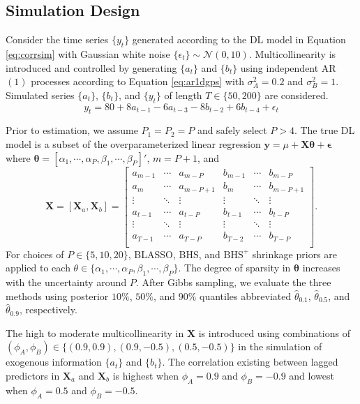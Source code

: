 \subsection{Simulation Design}
Consider the time series $\{y_t\}$ generated according to the DL model in Equation \ref{eq:corrsim} with Gaussian white noise $\{\epsilon_t\}\sim\mathcal{N}(0,10)$. Multicollinearity is introduced and controlled by generating $\{a_t\}$ and $\{b_t\}$ using independent AR$(1)$ processes according to Equation \ref{eq:ar1dgps} with $\sigma^2_A=0.2$ and $\sigma^2_B=1$. Simulated series $\{a_t\}$, $\{b_t\}$, and $\{y_t\}$ of length $T \in \{50,200\}$ are considered.
\begin{equation}
\label{eq:corrsim}
 y_t=80+8a_{t-1}-6a_{t-3}-8b_{t-2}+6b_{t-4}+\epsilon_t
\end{equation}

Prior to estimation, we assume $P_1=P_2=P$ and safely select $P > 4$. The true DL model is a subset of the overparameterized linear regression $\bm{y}=\mu+\bm{X}\bm{\theta}+\bm{\epsilon}$ where $\bm{\theta}=[\alpha_1,\cdots,\alpha_P,\beta_1,\cdots,\beta_P]'$, $m=P+1$, and
\begin{equation*}
\bm{X}=[\bm{X}_a,\bm{X}_b]=
	\begin{bmatrix} a_{m-1} & \cdots & a_{m-P} &
					b_{m-1} & \cdots & b_{m-P} \\
					a_{m} & \cdots & a_{m-P+1} &
					b_{m} & \cdots & b_{m-P+1} \\
					\vdots & \ddots & \vdots &
					\vdots &  \ddots & \vdots  \\
					a_{t-1} & \cdots & a_{t-P} &
					b_{t-1} & \cdots & b_{t-P} \\
					\vdots & \ddots & \vdots &
					\vdots &  \ddots & \vdots  \\
					a_{T-1} & \cdots & a_{T-P} &
					b_{T-2} & \cdots & b_{T-P} \\
	\end{bmatrix} .
\end{equation*}
For choices of $P\in\{5,10,20\}$, BLASSO, BHS, and $\textrm{BHS}^+$ shrinkage priors are applied to each $\theta \in \{\alpha_1,\cdots,\alpha_P,\beta_1,\cdots,\beta_P\}$. The degree of sparsity in $\bm{\theta}$ increases with the uncertainty around $P$.  After Gibbs sampling, we evaluate the three methods using posterior $10\%$, $50\%$, and $90\%$ quantiles abbreviated $\hat{\theta}_{0.1}$, $\hat{\theta}_{0.5}$, and $\hat{\theta}_{0.9}$, respectively.

The high to moderate multicollinearity in $\bm{X}$ is introduced using combinations of $(\phi_A,\phi_B) \in \{(0.9,0.9),(0.9,-0.5),(0.5,-0.5)\}$ in the simulation of exogenous information $\{a_t\}$ and $\{b_t\}$. The correlation existing between lagged predictors in $\bm{X}_a$ and $\bm{X}_b$ is highest when $\phi_A=0.9$ and $\phi_B=-0.9$ and lowest when $\phi_A=0.5$ and $\phi_B=-0.5$.

